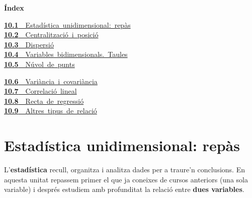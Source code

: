 \documentclass[11pt,a4paper]{article}
\begin{document}
\begin{tcolorbox}[colback=fmsurface,colframe=fmsurface,arc=3mm,left=4mm,right=4mm,top=2mm,bottom=2mm]
\small\textbf{Índex}\par\smallskip
\begin{minipage}[t]{0.49\linewidth}\small \mbox{\hyperlink{sec1}{\textbf{\color{fmgreen}10.1}\ \ Estadística unidimensional: repàs}}\\[3pt]
\mbox{\hyperlink{sec2}{\textbf{\color{fmgreen}10.2}\ \ Centralització i posició}}\\[3pt]
\mbox{\hyperlink{sec3}{\textbf{\color{fmgreen}10.3}\ \ Dispersió}}\\[3pt]
\mbox{\hyperlink{sec4}{\textbf{\color{fmgreen}10.4}\ \ Variables bidimensionals. Taules}}\\[3pt]
\mbox{\hyperlink{sec5}{\textbf{\color{fmgreen}10.5}\ \ Núvol de punts}}\\[3pt]\end{minipage}\hfill\begin{minipage}[t]{0.49\linewidth}\small \mbox{\hyperlink{sec6}{\textbf{\color{fmgreen}10.6}\ \ Variància i covariància}}\\[3pt]
\mbox{\hyperlink{sec7}{\textbf{\color{fmgreen}10.7}\ \ Correlació lineal}}\\[3pt]
\mbox{\hyperlink{sec8}{\textbf{\color{fmgreen}10.8}\ \ Recta de regressió}}\\[3pt]
\mbox{\hyperlink{sec9}{\textbf{\color{fmgreen}10.9}\ \ Altres tipus de relació}}\\[3pt]\end{minipage}
\end{tcolorbox}

\section{Estadística unidimensional: repàs}\hypertarget{sec1}{}

L'\textbf{estadística} recull, organitza i analitza dades per a traure'n conclusions. En aquesta unitat repassem primer el que ja coneixes de cursos anteriors (una sola variable) i després estudiem amb profunditat la relació entre \textbf{dues variables}.
\end{document}
